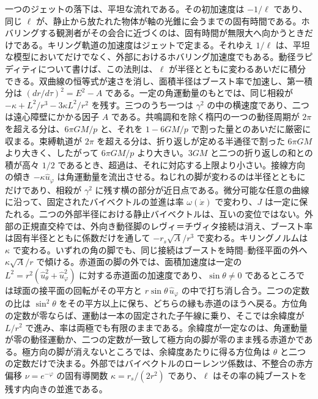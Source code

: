 \documentclass[a4paper]{article}
\begin{document}
一つのジェットの落下は、平坦な流れである。その初加速度は \(-1/\ell\) であり、同じ \(\ell\) が、静止から放たれた物体が軸の光錐に会うまでの固有時間である。ホバリングする観測者がその会合に近づくのは、固有時間が無限大へ向かうときだけである。キリング軌道の加速度はジェットで定まる。それゆえ \(1/\ell\) は、平坦な模型においてだけでなく、外部におけるホバリング加速度でもある。動径ラピディティについて書けば、この法則は、\(\ell\) が半径とともに変わるあいだに積分できる。双曲線の恒等式が速さを消し、面積半径はブースト率で加速し、第一積分は \((dr/d\tau)^{2}=E^{2}-A\) である。一定の角運動量のもとでは、同じ相殺が \(-\kappa+L^{2}/r^{3}-3\kappa L^{2}/r^{2}\) を残す。三つのうち一つは \(\gamma^{2}\) の中の横速度であり、二つは遠心障壁にかかる因子 \(A\) である。共鳴調和を除く楕円の一つの動径周期が \(2\pi\) を超える分は、\(6\pi GM/p\) と、それを \(1-6GM/p\) で割った量とのあいだに厳密に収まる。束縛軌道が \(2\pi\) を超える分は、折り返しが定める半通径で割った \(6\pi GM\) より大きく、したがって \(6\pi GM/p\) より大きい。\(3GM\) と二つの折り返しの和との積が高々 \(1/2\) であるとき、超過は、それに対応する上限より小さい。接線方向の傾き \(-\kappa\hat{u}_{\varphi}\) は角運動量を流出させる。ねじれの脚が変わるのは半径とともにだけであり、相殺が \(\gamma^{2}\) に残す横の部分が近日点である。微分可能な任意の曲線に沿って、固定されたバイベクトルの並進は率 \(\omega(\dot{x})\) で変わり、\(J\) は一定に保たれる。二つの外部半径における静止バイベクトルは、互いの変位ではない。外部の正規直交枠では、外向き動径脚のレヴィ＝チヴィタ接続は消え、ブースト率は固有半径とともに係数だけを通して \(-r_{s}\sqrt{A}/r^{3}\) で変わる。キリングノルムは \(\kappa\) で変わる。いずれの角の脚でも、同じ接続はブーストを時間--動径平面の外へ \(\kappa\sqrt{A}/r\) で傾ける。赤道面の脚の外では、面積加速度は一定の \(L^{2}=r^{2}(\hat{u}_{\theta}^{2}+\hat{u}_{\varphi}^{2})\) に対する赤道面の加速度であり、\(\sin\theta\neq 0\) であるところでは球面の接平面の回転がその平方と \(r\sin\theta\,\hat{u}_{\varphi}\) の中で打ち消し合う。二つの定数の比は \(\sin^{2}\theta\) をその平方以上に保ち、どちらの縁も赤道のほうへ戻る。方位角の定数が零ならば、運動は一本の固定された子午線に乗り、そこでは余緯度が \(L/r^{2}\) で進み、率は両極でも有限のままである。余緯度が一定なのは、角運動量が零の動径運動か、二つの定数が一致して極方向の脚が零のまま残る赤道かである。極方向の脚が消えないところでは、余緯度あたりに得る方位角は \(\theta\) と二つの定数だけで決まる。外部ではバイベクトルのローレンツ係数は、不整合の赤方偏移 \(\nu=e^{-\varphi}\) の固有導関数 \(\kappa=r_{s}/(2r^{2})\) であり、\(\ell\) はその率の純ブーストを残す内向きの並進である。
\end{document}
